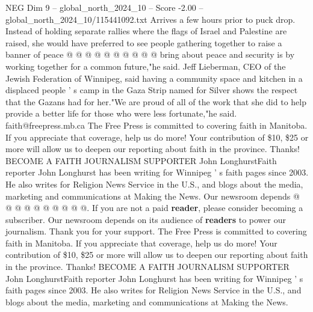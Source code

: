 \begin{textsample}{NEG Dim 9 – global\_north\_2024\_10 – Score -2.00 – global\_north\_2024\_10/115441092.txt}
Arrives a few hours prior to puck drop.
Instead of holding separate rallies where the flags of Israel and Palestine are raised, she would have preferred to see people gathering together to raise a banner of peace @ @ @ @ @ @ @ @ @ @ bring about peace and security is by working together for a common future,"he said.
Jeff Lieberman, CEO of the Jewish Federation of Winnipeg, said having a community space and kitchen in a displaced people ' s camp in the Gaza Strip named for Silver shows the respect that the Gazans had for her."We are proud of all of the work that she did to help provide a better life for those who were less fortunate,"he said. faith@freepress.mb.ca The Free Press is committed to covering faith in Manitoba.
If you appreciate that coverage, help us do more!
Your contribution of \$10, \$25 or more will allow us to deepen our reporting about faith in the province.
Thanks!
BECOME A FAITH JOURNALISM SUPPORTER John LonghurstFaith reporter John Longhurst has been writing for Winnipeg ' s faith pages since 2003.
He also writes for Religion News Service in the U.S., and blogs about the media, marketing and communications at Making the News.
Our newsroom depends @ @ @ @ @ @ @ @ @ @.
If you are not a paid \textbf{reader}, please consider becoming a subscriber.
Our newsroom depends on its audience of \textbf{readers} to power our journalism.
Thank you for your support.
The Free Press is committed to covering faith in Manitoba.
If you appreciate that coverage, help us do more!
Your contribution of \$10, \$25 or more will allow us to deepen our reporting about faith in the province.
Thanks!
BECOME A FAITH JOURNALISM SUPPORTER John LonghurstFaith reporter John Longhurst has been writing for Winnipeg ' s faith pages since 2003.
He also writes for Religion News Service in the U.S., and blogs about the media, marketing and communications at Making the News.

\end{textsample}
